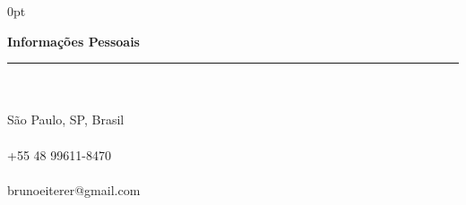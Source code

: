 \documentclass[a4paper]{article}
\begin{document}
\begin{adjustwidth}{\parindent}{0pt}
\begin{minipage}[t]{0.65\textwidth}
\end{minipage} \hspace{0.03\textwidth}
\begin{minipage}[t]{0.25\textwidth}
  \raggedright
  \Large{\textbf{Informações Pessoais}} \normalsize \\ \rule{\textwidth}{0.5pt} \\ \hspace{0pt} \\
   \small{São Paulo, SP, Brasil} \\ \hspace{0pt} \\
   \small{+55 48 99611-8470} \\ \hspace{0pt} \\
  \small{brunoeiterer@gmail.com} \\ \hspace{0pt} \\

\end{minipage}
\end{adjustwidth}
\end{document}
